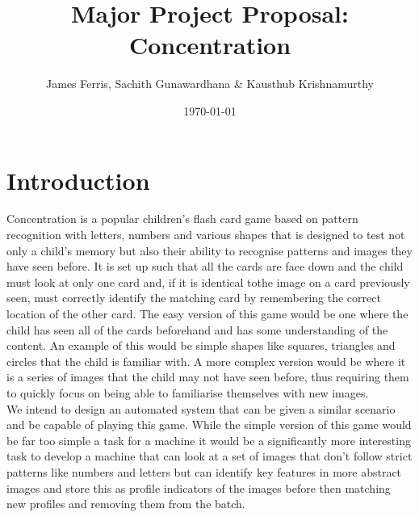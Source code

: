 \documentclass[dvips,12pt]{article}
\begin{document}

\title{Major Project Proposal: Concentration}
\author{James Ferris, Sachith Gunawardhana \& Kausthub Krishnamurthy}
\date{\today}



\maketitle


\section{Introduction}


Concentration is a popular children's flash card game based on pattern recognition with letters, numbers and various shapes that is designed to test not only a child's memory but also their ability to recognise patterns and images they have seen before. It is set up such that all the cards are face down and the child must look at only one card and, if it is identical tothe image on a card previously seen, must correctly identify the matching card by remembering the correct location of the other card. The easy version of this game would be one where the child has seen all of the cards beforehand and has some understanding of the content. An example of this would be simple shapes like squares, triangles and circles that the child is familiar with. A more complex version would be where it is a series of images that the child may not have seen before, thus requiring them to quickly focus on being able to familiarise themselves with new images.\\%

We intend to design an automated system that can be given a similar scenario and be capable of playing this game. While the simple version of this game would be far too simple a task for a machine it would be a significantly more interesting task to develop a machine that can look at a set of images that don't follow strict patterns like numbers and letters but can identify key features in more abstract images and store this as profile indicators of the images before then matching new profiles and removing them from the batch.
\end{document}
